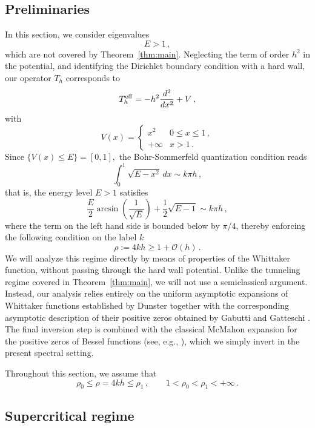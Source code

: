 \documentclass[11pt]{amsart}
\numberwithin{equation}{section}
\theoremstyle{remark}
\newcommand{\mn}{\medskip\noindent}
\begin{document}
\subsection{Preliminaries}
In this section, we consider eigenvalues
\[E> 1\,,\]
which are not covered by Theorem~\ref{thm:main}. Neglecting the term of order $h^2$ in the potential, and identifying  the Dirichlet boundary condition with a hard wall, our operator $T_h$ corresponds to
\[T_h^{\rm eff}=- h^2 \frac{d^2}{dx^2}+V\,,\]
with
\[V(x)=\begin{cases}
    x^2&0\leq x\leq 1\,,\\
    +\infty&x>1\,.
\end{cases}\]
Since $\{V(x)\leq E\}=[0,1],$ the Bohr-Sommerfeld quantization condition reads \cite{Olver, HR}
%
\begin{equation}\label{eq:Bohr-Sommerfeld}
\int_0^1\sqrt{E-x^2}\,dx\sim k\pi h\,,
\end{equation}
%
that is, the energy level $E>1$ satisfies
\begin{equation}\label{eq:Bohr-Sommerfeld2}
\frac{E}{2} \arcsin\left(\frac{1}{\sqrt{E}}\right) + \frac{1}{2}\sqrt{E - 1} \sim k\pi h\,,
\end{equation}
%
where the term on the left hand side is bounded below by $\pi/4$, thereby enforcing the following condition on the label $k$
\begin{equation}\label{eq:BS-label}
\rho:=4kh\geq 1+\mathcal O(h)\,.
\end{equation}
We will analyze this regime directly by means of properties of the
	Whittaker function, without passing through the hard wall potential.
	Unlike the tunneling regime covered in Theorem~\ref{thm:main}, we will not use
	a semiclassical argument.
	Instead, our analysis relies entirely on the uniform asymptotic
	expansions of Whittaker functions established by Dunster
	\cite{Dunster} together with the corresponding asymptotic
	description of their positive zeros obtained by Gabutti and
	Gatteschi \cite{GG2001}. The final inversion step is combined with the
	classical McMahon expansion for the positive zeros of Bessel functions
	(see, e.g., \cite[\S10.21]{DLMF}), which we simply invert in the present
	spectral setting.
	
	
	\mn
	Throughout this section, we assume that
	\begin{equation}\label{eq:sc}
		\rho_0\leq \rho=4kh\leq \rho_1\,,
		\qquad
		1<\rho_0<\rho_1<+\infty\,.
\end{equation}

\subsection{Supercritical regime}\label{subsec:sc}
%
\end{document}

